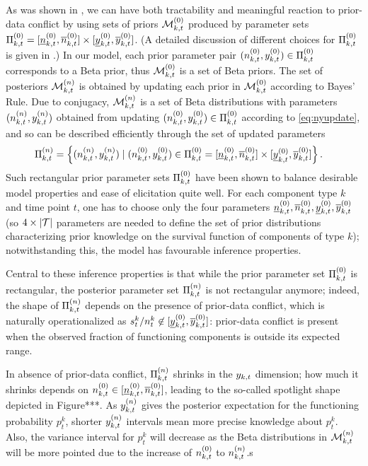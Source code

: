\documentclass[authoryear, 12pt, a4paper]{elsarticle}
\begin{document}
As was shown in \citet{2009:WalterAugustin}, %
we can have both tractability and meaningful reaction to prior-data conflict
by using sets of priors $\mathcal{M}^{(0)}_{k,t}$ produced by parameter sets $\Pi^{(0)}_{k,t} = [\underline{n}^{(0)}_{k,t}, \overline{n}^{(0)}_{k,t}] \times [\underline{y}^{(0)}_{k,t}, \overline{y}^{(0)}_{k,t}]$. 
(A detailed discussion of different choices for $\Pi^{(0)}_{k,t}$ is given in \citet[\S 3.1]{2013:diss-gw}.)
In our model, each prior parameter pair $(n^{(0)}_{k,t}, y^{(0)}_{k,t}) \in \Pi^{(0)}_{k,t}$
corresponds to a Beta prior, thus $\mathcal{M}^{(0)}_{k,t}$ is a set of Beta priors.
The set of posteriors $\mathcal{M}^{(n)}_{k,t}$ is obtained by updating each prior in $\mathcal{M}^{(0)}_{k,t}$ according to Bayes' Rule.
Due to conjugacy, $\mathcal{M}^{(n)}_{k,t}$ is a set of Beta distributions with parameters $(n^{(n)}_{k,t}, y^{(n)}_{k,t})$
obtained from updating $(n^{(0)}_{k,t}, y^{(0)}_{k,t}) \in \Pi^{(0)}_{k,t}$ according to \eqref{eq:nyupdate},
and so can be described efficiently through the set of updated parameters
\begin{align*}
\Pi^{(n)}_{k,t} &= \Big\{ (n^{(n)}_{k,t}, y^{(n)}_{k,t}) \mid (n^{(0)}_{k,t}, y^{(0)}_{k,t}) \in \Pi^{(0)}_{k,t} = [\underline{n}^{(0)}_{k,t}, \overline{n}^{(0)}_{k,t}] \times [\underline{y}^{(0)}_{k,t}, \overline{y}^{(0)}_{k,t}] \Big\}\,.
\end{align*}
Such rectangular prior parameter sets $\Pi^{(0)}_{k,t}$ have been shown
to balance desirable model properties and ease of elicitation quite well.
%
For each component type $k$ and time point $t$,
one has to choose only the four parameters $\underline{n}^{(0)}_{k,t}, \overline{n}^{(0)}_{k,t}, \underline{y}^{(0)}_{k,t}, \overline{y}^{(0)}_{k,t}$
(so $4 \times |{\cal T}|$ parameters are needed to define the set of prior distributions characterizing
prior knowledge on the survival function of components of type $k$);
notwithstanding this, the model has favourable inference properties.

Central to these inference properties is that
while the prior parameter set $\Pi^{(0)}_{k,t}$ is rectangular,
the posterior parameter set $\Pi^{(n)}_{k,t}$ is not rectangular anymore;
indeed, the shape of $\Pi^{(n)}_{k,t}$ depends on the presence of prior-data conflict,
which is naturally operationalized as $s^k_t/n^k_t \not\in [\underline{y}^{(0)}_{k,t}, \overline{y}^{(0)}_{k,t}]$:
prior-data conflict is present when the observed fraction of functioning components
is outside its expected range.

In absence of prior-data conflict, 
$\Pi^{(n)}_{k,t}$ shrinks in the $y_{k,t}$ dimension;
how much it shrinks depends on $n^{(0)}_{k,t} \in [\underline{n}^{(0)}_{k,t}, \overline{n}^{(0)}_{k,t}]$,
leading to the so-called spotlight shape depicted in Figure***.
As $y^{(n)}_{k,t}$ gives the posterior expectation for the functioning probability $p_t^k$,
shorter $y^{(n)}_{k,t}$ intervals mean more precise knowledge about $p_t^k$.
Also, the variance interval for $p_t^k$ will decrease
as the Beta distributions in $\mathcal{M}^{(n)}_{k,t}$ will be more pointed
due to the increase of $n^{(0)}_{k,t}$ to $n^{(n)}_{k,t}$.s
\end{document}
